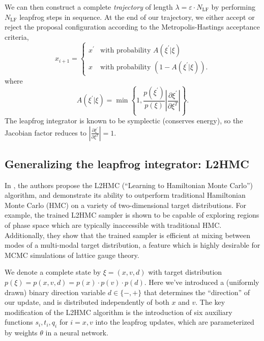 \documentclass{article} %
\begin{document}
%
We can then construct a complete \emph{trajectory} of length \(\lambda = \varepsilon\cdot N_{\mathrm{LF}}\) by
performing \(N_{\mathrm{LF}}\) leapfrog steps in sequence.
%
At the end of our trajectory, we either accept or reject the proposal configuration according to the Metropolis-Hastings
acceptance criteria,
%
\begin{equation}
   x_{i+1} =
   \begin{cases}%
      x^{\prime} &\mbox{with probability } A(\xi^{\prime}|\xi) \\
      x &\mbox{with probability } (1 - A(\xi^{\prime}|\xi)).
   \end{cases}
\end{equation}
%
where
%
\begin{equation}
   A(\xi^{\prime}|\xi) = \min\left\{%
      1,\frac{p(\xi^{\prime})}{p(\xi)}\left|%
      \frac{\partial\xi^{\prime}}{\partial\xi^{T}}
      \right|%
   \right\}.
   \label{eq:mhcriteria}
\end{equation}
%
The leapfrog integrator is known to be symplectic (conserves energy), so the Jacobian factor reduces to
\(\left|\frac{\partial\xi^{\prime}}{\partial\xi^{T}}\right| = 1\). 
%
%
\subsection{\label{sec:l2hmc}Generalizing the leapfrog integrator: L2HMC}
In \citep{levy2017}, the authors propose the L2HMC (``Learning to Hamiltonian Monte Carlo'') algorithm, and demonstrate
its ability to outperform traditional Hamiltonian Monte Carlo (HMC) on a variety of two-dimensional target
distributions.
%
For example, the trained L2HMC sampler is shown to be capable of exploring regions of phase space which are typically
inaccessible with traditional HMC.\@
%
Additionally, they show that the trained sampler is efficient at mixing between modes of a multi-modal target
distribution, a feature which is highly desirable for MCMC simulations of lattice gauge theory.
%

We denote a complete state by \(\xi = (x, v, d)\) with target distribution \(p(\xi) = p(x, v, d) = p(x)\cdot p(v)\cdot
p(d)\).
%
Here we've introduced a (uniformly drawn) binary direction variable \(d\in\{-,+\}\) that determines the ``direction'' of
our update, and is distributed independently of both \(x\) and \(v\).
%
The key modification of the L2HMC algorithm is the introduction of six auxiliary functions \(s_{i}, t_{i}, q_{i}\) for \(i
= x, v\) into the leapfrog updates, which are parameterized by weights \(\theta\) in a neural network.
%
%
\end{document}

